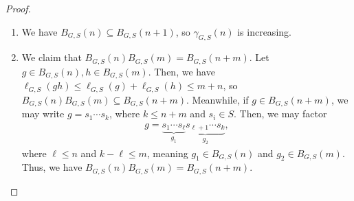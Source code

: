 \documentclass[10pt]{mypackage}
\begin{document}
\begin{proof}\hfill
  \begin{enumerate}[(1)]
    \item We have $B_{G,S}\left(n\right) \subseteq B_{G,S}\left(n+1\right)$, so $\gamma_{G,S}\left(n\right)$ is increasing.
    \item We claim that $B_{G,S}\left(n\right)B_{G,S}\left(m\right) = B_{G,S}\left(n+m\right)$. Let $g\in B_{G,S}\left(n\right),h\in B_{G,S}\left(m\right)$. Then, we have $\ell_{G,S}\left(gh\right) \leq \ell_{G,S}\left(g\right) + \ell_{G,S}\left(h\right) \leq m+n$, so $B_{G,S}\left(n\right) B_{G,S}\left(m\right) \subseteq B_{G,S}\left(n+m\right)$. Meanwhile, if $g\in B_{G,S}\left(n+m\right)$, we may write $g = s_1\cdots s_k$, where $k\leq n+m$ and $s_i\in S$. Then, we may factor 
      \begin{align*}
        g = \underbrace{s_{1}\cdots s_{\ell}}_{g_1}\underbrace{s_{\ell+1}\cdots s_k}_{g_2},
      \end{align*}
      where $\ell \leq n$ and $k-\ell \leq m$, meaning $g_1\in B_{G,S}\left(n\right)$ and $g_2\in B_{G,S}\left(m\right)$. Thus, we have $B_{G,S}\left(n\right)B_{G,S}\left(m\right) = B_{G,S}\left(n+m\right)$.\newline


\end{enumerate}
\end{proof}
\end{document}
